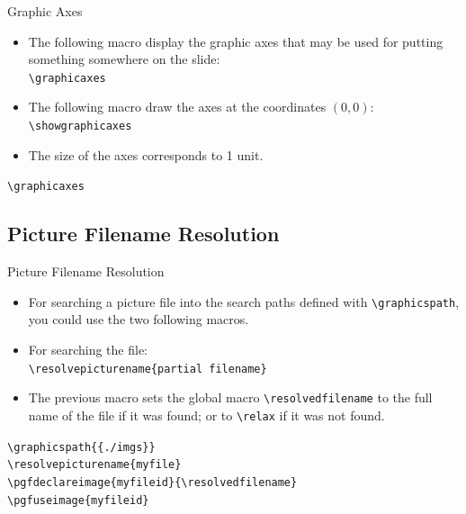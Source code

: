 \documentclass[english,sectioncirclenumberstyle]{ciadbeamer}
\begin{document}
\begin{frame}{Graphic Axes}
	\begin{itemize}
	\item The following macro display the graphic axes that may be used for putting something somewhere on the slide: \\
		\texttt{{\textbackslash}graphicaxes}
	\item The following macro draw the axes at the coordinates $(0,0)$: \\
		\texttt{{\textbackslash}showgraphicaxes}
	\item The size of the axes corresponds to 1 unit.
	\end{itemize}
	\begin{example}
		\texttt{{\textbackslash}graphicaxes}\\
		\graphicaxes
	\end{example}
\end{frame}

\subsection{Picture Filename Resolution}

\begin{frame}{Picture Filename Resolution}
	\begin{itemize}
	\item For searching a picture file into the search paths defined with \texttt{{\textbackslash}graphicspath}, you could use the two following macros.
	\item For searching the file: \\
		\texttt{{\textbackslash}resolvepicturename\{partial filename\}}
	\item The previous macro sets the global macro \texttt{{\textbackslash}resolvedfilename} to the full name of the file if it was found; or to \texttt{{\textbackslash}relax} if it was not found.
	\end{itemize}
	\begin{example}
		\texttt{{\textbackslash}graphicspath\{\{./imgs\}\}} \\
		\texttt{{\textbackslash}resolvepicturename\{myfile\}} \\
		\texttt{{\textbackslash}pgfdeclareimage\{myfileid\}\{{\textbackslash}resolvedfilename\}} \\
		\texttt{{\textbackslash}pgfuseimage\{myfileid\}} \\
	\end{example}
\end{frame}
\end{document}
